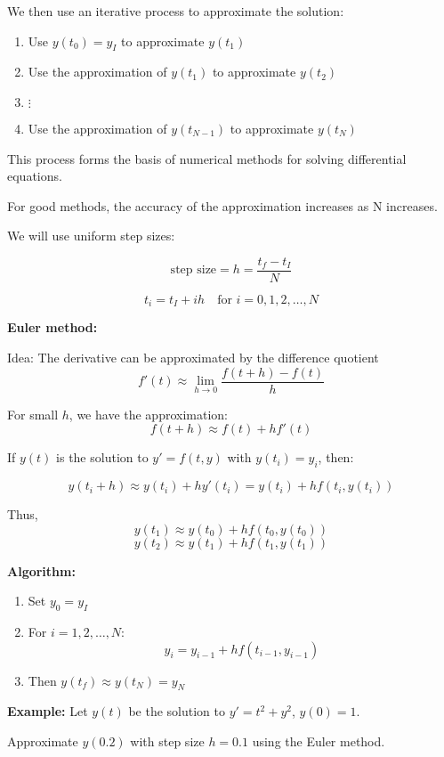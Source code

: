 \documentclass{article}
\begin{document}
We then use an iterative process to approximate the solution:

\begin{enumerate}
    \item Use $y(t_0) = y_I$ to approximate $y(t_1)$
    \item Use the approximation of $y(t_1)$ to approximate $y(t_2)$
    \item $\vdots$
    \item Use the approximation of $y(t_{N-1})$ to approximate $y(t_N)$
\end{enumerate}

This process forms the basis of numerical methods for solving differential equations.


For good methods, the accuracy of the approximation increases as N increases.

We will use uniform step sizes:

\[
\text{step size} = h = \frac{t_f - t_I}{N}
\]

\[
t_i = t_I + ih \quad \text{for } i = 0, 1, 2, \ldots, N
\]

\textbf{Euler method:}

Idea: The derivative can be approximated by the difference quotient
\[
f'(t) \approx \lim_{h \to 0} \frac{f(t+h) - f(t)}{h}
\]

For small $h$, we have the approximation:
\[
f(t+h) \approx f(t) + hf'(t)
\]


If $y(t)$ is the solution to $y' = f(t,y)$ with $y(t_i) = y_i$, then:

\[
y(t_i + h) \approx y(t_i) + hy'(t_i) = y(t_i) + hf(t_i, y(t_i))
\]

Thus,
\[
y(t_1) \approx y(t_0) + hf(t_0, y(t_0))
\]
\[
y(t_2) \approx y(t_1) + hf(t_1, y(t_1))
\]

\textbf{Algorithm:}
\begin{enumerate}
    \item Set $y_0 = y_I$
    \item For $i = 1, 2, \ldots, N$:
    \[
    y_i = y_{i-1} + hf(t_{i-1}, y_{i-1})
    \]
    \item Then $y(t_f) \approx y(t_N) = y_N$
\end{enumerate}


\textbf{Example:} Let $y(t)$ be the solution to $y' = t^2 + y^2$, $y(0) = 1$.

Approximate $y(0.2)$ with step size $h = 0.1$ using the Euler method.
\end{document}
